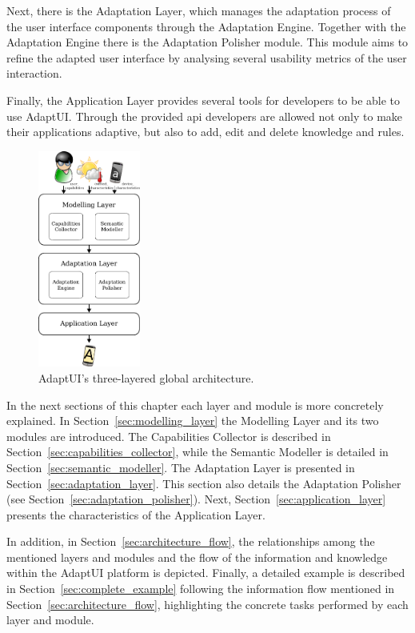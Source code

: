 Next, there is the Adaptation Layer, which manages the adaptation process of the
user interface components through the Adaptation Engine. Together with the
Adaptation Engine there is the Adaptation Polisher module. This module aims to
refine the adapted user interface by analysing several usability metrics of the
user interaction.

Finally, the Application Layer provides several tools for developers to be able
to use AdaptUI. Through the provided \ac{api} developers are allowed not only to
make their applications adaptive, but also to add, edit and delete knowledge and
rules.

\begin{figure}[H]
\centering
\includegraphics[width=0.30\textwidth]{architecture.pdf}
\caption{AdaptUI's three-layered global architecture.}
\label{fig:architecture}
\end{figure}

In the next sections of this chapter each layer and module is more concretely
explained. In Section~\ref{sec:modelling_layer} the Modelling Layer and
its two modules are introduced. The Capabilities Collector is described in
Section~\ref{sec:capabilities_collector}, while the Semantic Modeller is 
detailed in Section~\ref{sec:semantic_modeller}. The Adaptation Layer is 
presented in Section~\ref{sec:adaptation_layer}. This section also details the 
Adaptation Polisher (see Section~\ref{sec:adaptation_polisher}). Next,
Section~\ref{sec:application_layer} presents the characteristics of the 
Application Layer.

In addition, in Section~\ref{sec:architecture_flow}, the relationships among 
the mentioned layers and modules and the flow of the information and knowledge 
within the AdaptUI platform is depicted. Finally, a detailed example is
described in Section~\ref{sec:complete_example} following the information flow
mentioned in Section~\ref{sec:architecture_flow}, highlighting the concrete
tasks performed by each layer and module.







